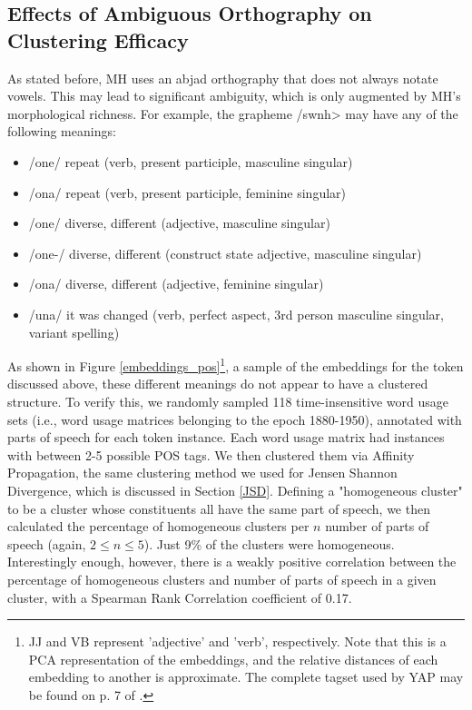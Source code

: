 \documentclass[10pt, a4paper]{article}
\begin{document}
\subsection{Effects of Ambiguous Orthography on Clustering Efficacy}
As stated before, MH uses an abjad orthography that does not always notate vowels. This may lead to significant ambiguity, which is only augmented by MH's morphological richness. For example, the grapheme \</swnh> may have any of the following meanings:
\begin{itemize}
    \item /\textesh one/ repeat (verb, present participle, masculine singular)
    \item /\textesh ona/ repeat (verb, present participle, feminine singular)
    \item /\textesh one/ diverse, different (adjective, masculine singular)
    \item /\textesh one-/ diverse, different (construct state adjective, masculine singular)
    \item /\textesh ona/ diverse, different (adjective, feminine singular)
    \item /\textesh una/ it was changed (verb, perfect aspect, 3rd person masculine singular, variant spelling)
\end{itemize}

As shown in Figure \ref{embeddings_pos}\footnote{JJ and VB represent 'adjective' and 'verb', respectively. Note that this is a PCA representation of the embeddings, and the relative distances of each embedding to another is approximate. The complete tagset used by YAP may be found on p. 7 of .}, a sample of the embeddings for the token discussed above, these different meanings do not appear to have a clustered structure. 
To verify this, we randomly sampled 118 time-insensitive word usage sets (i.e., word usage matrices belonging to the epoch 1880-1950), annotated with parts of speech for each token instance. Each word usage matrix had instances with between 2-5 possible POS tags. We then clustered them via Affinity Propagation, the same clustering method we used for Jensen Shannon Divergence, which is discussed in Section \ref{JSD}. Defining a "homogeneous cluster" to be a cluster whose constituents all have the same part of speech, we then calculated the percentage of homogeneous clusters per $n$ number of parts of speech (again, $2 \leq n \leq 5$). Just 9\% of the clusters were homogeneous. Interestingly enough, however, there is a weakly positive correlation between the percentage of homogeneous clusters and number of parts of speech in a given cluster, with a Spearman Rank Correlation coefficient of 0.17.
\end{document}
